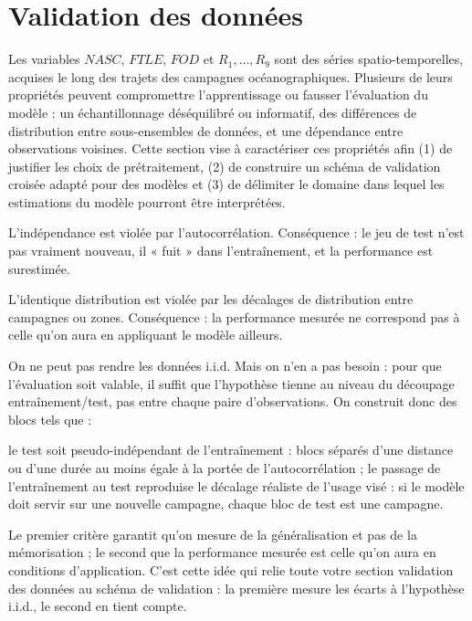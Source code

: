 \section{Validation des données} %
	Les variables $NASC$, $FTLE$, $FOD$ et $R_1, \ldots, R_9$ sont des séries spatio-temporelles, acquises le long des trajets des campagnes océanographiques. Plusieurs de leurs propriétés peuvent compromettre l'apprentissage ou fausser l'évaluation du modèle : un échantillonnage déséquilibré ou informatif, des différences de distribution entre sous-ensembles de données, et une dépendance entre observations voisines. Cette section vise à caractériser ces propriétés afin (1) de justifier les choix de prétraitement, (2) de construire un schéma de validation croisée adapté pour des modèles et (3) de délimiter le domaine dans lequel les estimations du modèle pourront être interprétées.
	
	L'indépendance est violée par l'autocorrélation. Conséquence : le jeu de test n'est pas vraiment nouveau, il « fuit » dans l'entraînement, et la performance est surestimée.
	
	L'identique distribution est violée par les décalages de distribution entre campagnes ou zones. Conséquence : la performance mesurée ne correspond pas à celle qu'on aura en appliquant le modèle ailleurs.
	
	On ne peut pas rendre les données i.i.d. Mais on n'en a pas besoin : pour que l'évaluation soit valable, il suffit que l'hypothèse tienne au niveau du découpage entraînement/test, pas entre chaque paire d'observations. On construit donc des blocs tels que :
	
	le test soit pseudo-indépendant de l'entraînement : blocs séparés d'une distance ou d'une durée au moins égale à la portée de l'autocorrélation ;
	le passage de l'entraînement au test reproduise le décalage réaliste de l'usage visé : si le modèle doit servir sur une nouvelle campagne, chaque bloc de test est une campagne.
	
	Le premier critère garantit qu'on mesure de la généralisation et pas de la mémorisation ; le second que la performance mesurée est celle qu'on aura en conditions d'application. C'est cette idée qui relie toute votre section validation des données au schéma de validation : la première mesure les écarts à l'hypothèse i.i.d., le second en tient compte.
	
